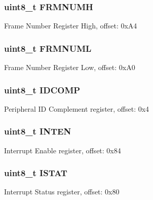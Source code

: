 \subsubsection[{F\+R\+M\+N\+U\+M\+H}]{\setlength{\rightskip}{0pt plus 5cm}uint8\+\_\+t F\+R\+M\+N\+U\+M\+H}\label{struct_u_s_b___mem_map_a7a6da4448f48d914ac3eb2fa20fd01dc}
Frame Number Register High, offset\+: 0x\+A4 \hypertarget{struct_u_s_b___mem_map_a09975da0df19fff110854fe74d794536}{}
\subsubsection[{F\+R\+M\+N\+U\+M\+L}]{\setlength{\rightskip}{0pt plus 5cm}uint8\+\_\+t F\+R\+M\+N\+U\+M\+L}\label{struct_u_s_b___mem_map_a09975da0df19fff110854fe74d794536}
Frame Number Register Low, offset\+: 0x\+A0 \hypertarget{struct_u_s_b___mem_map_a694d344ab54e43fa5ce23e1aeae4069a}{}
\subsubsection[{I\+D\+C\+O\+M\+P}]{\setlength{\rightskip}{0pt plus 5cm}uint8\+\_\+t I\+D\+C\+O\+M\+P}\label{struct_u_s_b___mem_map_a694d344ab54e43fa5ce23e1aeae4069a}
Peripheral I\+D Complement register, offset\+: 0x4 \hypertarget{struct_u_s_b___mem_map_af6cfd1621bc7540fb4f1a7f73a98377f}{}
\subsubsection[{I\+N\+T\+E\+N}]{\setlength{\rightskip}{0pt plus 5cm}uint8\+\_\+t I\+N\+T\+E\+N}\label{struct_u_s_b___mem_map_af6cfd1621bc7540fb4f1a7f73a98377f}
Interrupt Enable register, offset\+: 0x84 \hypertarget{struct_u_s_b___mem_map_a1f5db2936f79213669c994319c80201b}{}
\subsubsection[{I\+S\+T\+A\+T}]{\setlength{\rightskip}{0pt plus 5cm}uint8\+\_\+t I\+S\+T\+A\+T}\label{struct_u_s_b___mem_map_a1f5db2936f79213669c994319c80201b}
Interrupt Status register, offset\+: 0x80 \hypertarget{struct_u_s_b___mem_map_a4d4155ad45912de6f47166b4268fed6f}{}

